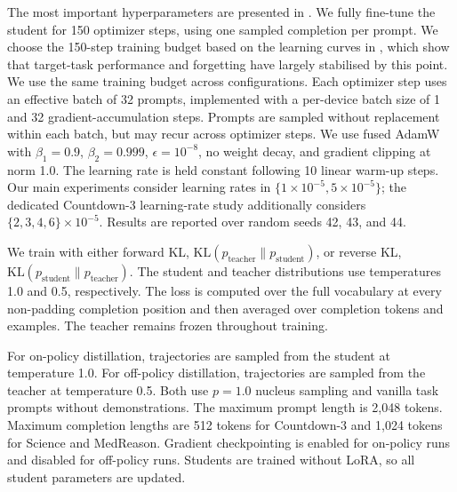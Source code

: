 \documentclass{article} %
\theoremstyle{plain}
\theoremstyle{definition}
\theoremstyle{remark}
\begin{document}
The most important hyperparameters are presented in . We fully fine-tune the student for 150 optimizer steps, using one sampled completion per prompt. 
We choose the 150-step training budget based on the learning curves in , which show that target-task performance and forgetting have largely stabilised by this point.
We use the same training budget across configurations.
Each optimizer step uses an effective batch of 32 prompts, implemented with a per-device batch size of 1 and 32 gradient-accumulation steps. Prompts are sampled without replacement within each batch, but may recur across optimizer steps. We use fused AdamW with $\beta_1=0.9$, $\beta_2=0.999$, $\epsilon=10^{-8}$, no weight decay, and gradient clipping at norm 1.0. The learning rate is held constant following 10 linear warm-up steps. Our main experiments consider learning rates in $\{1\times10^{-5},5\times10^{-5}\}$; the dedicated Countdown-3 learning-rate study additionally considers $\{2,3,4,6\}\times10^{-5}$. Results are reported over random seeds 42, 43, and 44.

We train with either forward KL, $\mathrm{KL}(p_{\mathrm{teacher}}\|p_{\mathrm{student}})$, or reverse KL, $\mathrm{KL}(p_{\mathrm{student}}\|p_{\mathrm{teacher}})$. The student and teacher distributions use temperatures 1.0 and 0.5, respectively. The loss is computed over the full vocabulary at every non-padding completion position and then averaged over completion tokens and examples. The teacher remains frozen throughout training.

For on-policy distillation, trajectories are sampled from the student at temperature 1.0. For off-policy distillation, trajectories are sampled from the teacher at temperature 0.5. Both use $p=1.0$ nucleus sampling and vanilla task prompts without demonstrations. The maximum prompt length is 2,048 tokens. Maximum completion lengths are 512 tokens for Countdown-3 and 1,024 tokens for Science and MedReason. Gradient checkpointing is enabled for on-policy runs and disabled for off-policy runs. Students are trained without LoRA, so all student parameters are updated.
\end{document}
